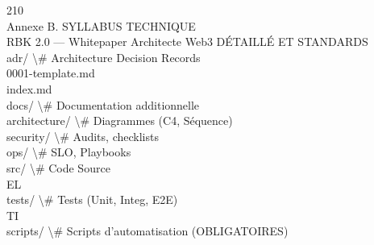 \vspace{0.5em}
\vspace{0.5em}
\vspace{0.5em}
\vspace{0.5em}
210\\
Annexe B. SYLLABUS TECHNIQUE\\
RBK 2.0 — Whitepaper Architecte Web3                                                                       DÉTAILLÉ ET STANDARDS\\
\vspace{0.5em}
\vspace{0.5em}
\vspace{0.5em}
adr/                        \textbackslash{}# Architecture Decision Records\\
0001-template.md\\
index.md\\
\vspace{0.5em}
\vspace{0.5em}
docs/                       \textbackslash{}# Documentation additionnelle\\
architecture/             \textbackslash{}# Diagrammes (C4, Séquence)\\
security/                 \textbackslash{}# Audits, checklists\\
ops/                      \textbackslash{}# SLO, Playbooks\\
\vspace{0.5em}
\vspace{0.5em}
src/                        \textbackslash{}# Code Source\\
\vspace{0.5em}
\vspace{0.5em}
\vspace{0.5em}
\vspace{0.5em}
EL\\
tests/                      \textbackslash{}# Tests (Unit, Integ, E2E)\\
\vspace{0.5em}
\vspace{0.5em}
\vspace{0.5em}
\vspace{0.5em}
TI\\
scripts/                    \textbackslash{}# Scripts d'automatisation (OBLIGATOIRES)\\
\vspace{0.5em}
\vspace{0.5em}
\vspace{0.5em}
\vspace{0.5em}
